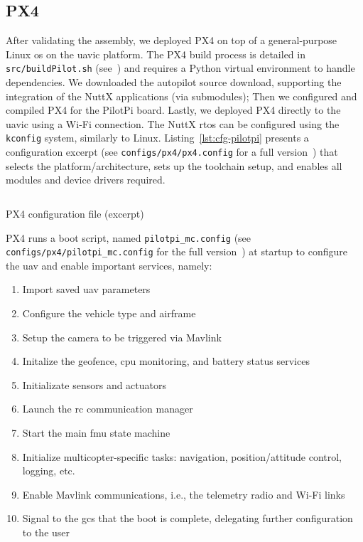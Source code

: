\subsection{PX4}
\label{sec:px4}
After validating the assembly, we deployed PX4 on top of a general-purpose Linux
\gls{os} on the \gls{uavic} platform. The PX4 build process is detailed in
\lstinline{src/buildPilot.sh} (see~\cite{thesis-sw-github}) and requires a
Python virtual environment to handle dependencies. We downloaded the autopilot
source download, supporting the integration of the NuttX applications (via
submodules); Then we configured and compiled PX4 for the PilotPi board. Lastly,
we deployed PX4 directly to the \gls{uavic} using a Wi-Fi connection.
%
The NuttX \gls{rtos} can be configured using the \lstinline{kconfig} system,
similarly to Linux. Listing~\ref{lst:cfg-pilotpi} presents a configuration
excerpt (see \lstinline{configs/px4/px4.config} for a full version~\cite{thesis-sw-github}) that selects the platform/architecture, sets up the toolchain setup, and
enables all modules and device drivers required.

\begin{longlisting}
\centering
\inputminted[]{kconfig}{./listing/px4.config}
\caption{PX4 configuration file (excerpt)}
\label{lst:cfg-pilotpi}
\end{longlisting}

PX4 runs a boot script, named \lstinline{pilotpi_mc.config} (see
\lstinline{configs/px4/pilotpi_mc.config} for the full
version~\cite{thesis-sw-github}) at startup to configure the \gls{uav} and
enable important services, namely:
\begin{enumerate}[noitemsep,topsep=0pt]
\item Import saved \gls{uav} parameters
\item Configure the vehicle type and airframe
\item Setup the camera to be triggered via Mavlink
\item Initalize the geofence, \gls{cpu} monitoring, and battery status services
\item Initializate sensors and actuators
\item Launch the \gls{rc} communication manager
\item Start the main \gls{fmu} state machine
\item Initialize multicopter-specific tasks: navigation, position/attitude
  control, logging, etc.
\item Enable Mavlink communications, i.e., the telemetry radio and Wi-Fi links
\item Signal to the \gls{gcs} that the boot is complete, delegating further
  configuration to the user
\end{enumerate}

